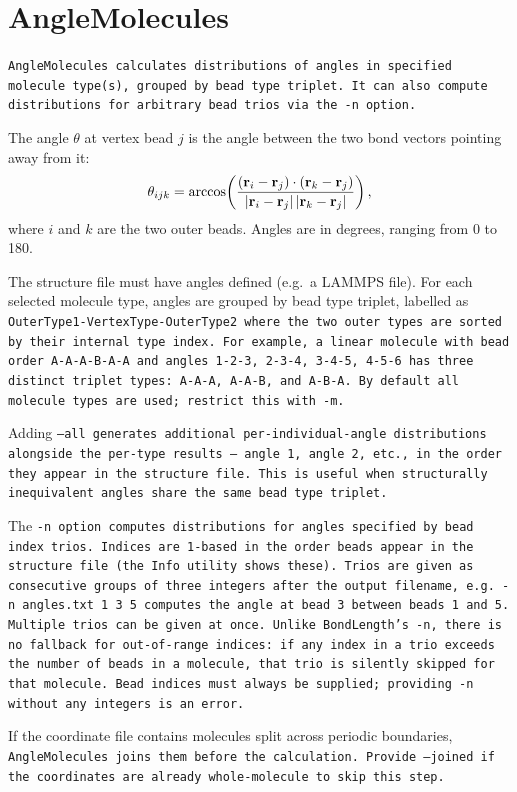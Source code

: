 \section{AngleMolecules} \label{sec:AngleMolecules}

\tt{AngleMolecules} calculates distributions of angles in specified molecule
type(s), grouped by bead type triplet. It can also compute distributions for
arbitrary bead trios via the \tt{-n} option.

The angle $\theta$ at vertex bead $j$ is the angle between the two bond vectors
pointing away from it:
\begin{equation}
  \theta_{ijk} = \arccos\!\left(
    \frac{(\mathbf{r}_i - \mathbf{r}_j)\cdot(\mathbf{r}_k - \mathbf{r}_j)}
         {|\mathbf{r}_i - \mathbf{r}_j|\,|\mathbf{r}_k - \mathbf{r}_j|}
  \right),
\end{equation}
where $i$ and $k$ are the two outer beads. Angles are in degrees, ranging from 0
to 180.

The structure file must have angles defined (e.g.\ a LAMMPS \data file). For each
selected molecule type, angles are grouped by bead type triplet, labelled as
\tt{OuterType1-VertexType-OuterType2} where the two outer types are sorted by
their internal type index. For example, a linear molecule with bead order
A-A-A-B-A-A and angles 1-2-3, 2-3-4, 3-4-5, 4-5-6 has three distinct triplet
types: A-A-A, A-A-B, and A-B-A. By default all molecule types are used; restrict
this with \tt{-m}.

Adding \tt{--all} generates additional per-individual-angle distributions
alongside the per-type results --- angle~1, angle~2, etc., in the order they
appear in the structure file. This is useful when structurally inequivalent angles
share the same bead type triplet.

The \tt{-n} option computes distributions for angles specified by bead index
trios. Indices are 1-based in the order beads appear in the structure file (the
\tt{Info} utility shows these). Trios are given as consecutive groups of three
integers after the output filename, e.g.\ \tt{-n angles.txt 1 3 5} computes the
angle at bead~3 between beads~1 and~5. Multiple trios can be given at once.
Unlike \tt{BondLength}'s \tt{-n}, there is no fallback for out-of-range indices:
if any index in a trio exceeds the number of beads in a molecule, that trio is
silently skipped for that molecule. Bead indices must always be supplied;
providing \tt{-n} without any integers is an error.

If the coordinate file contains molecules split across periodic boundaries,
\tt{AngleMolecules} joins them before the calculation. Provide \tt{--joined} if
the coordinates are already whole-molecule to skip this step.

